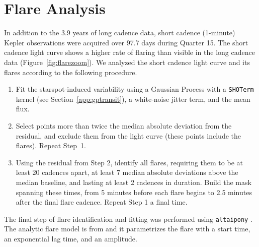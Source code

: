 \documentclass[12pt,modern,twocolumn,tighten]{aastex63}
\begin{document}
\section{Flare Analysis}
\label{app:flare}

In addition to the 3.9 years of long cadence data, short cadence
(1-minute) Kepler observations were acquired over 97.7 days during
Quarter 15.  The short cadence light curve shows a higher rate of
flaring than visible in the long cadence data
(Figure~\ref{fig:flarezoom}).  We analyzed the short cadence light
curve and its flares according to the following procedure.
\begin{enumerate}
  \item Fit the starspot-induced variability using a
    Gaussian Process with a \texttt{SHOTerm} kernel (see
    Section~\ref{app:gptransit}), a white-noise jitter term, and the
    mean flux.
  \item Select points more than twice the median absolute
    deviation from the residual, and exclude them from the light
    curve (these points include the flares).  Repeat Step~1.
  \item Using the residual from Step 2, identify all flares,
    requiring them to be at least 20 cadences apart, at least 7 median
    absolute deviations above the median baseline, and lasting at
    least 2 cadences in duration.  Build the mask spanning these
    times, from 5 minutes before each flare begins to 2.5 minutes
    after the final flare cadence.  Repeat Step 1 a final time.
\end{enumerate}
The final step of flare identification and fitting was performed using \texttt{altaipony}
\citep{davenport_2016,ilin_flares_2021}.  The analytic flare model is
from \citet{davenport_2014} and it parametrizes the flare with a start
time, an exponential lag time, and an amplitude.
\end{document}
